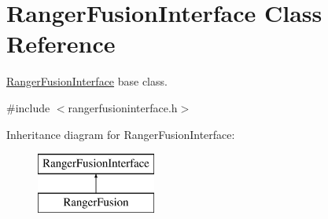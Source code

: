 \hypertarget{classRangerFusionInterface}{}\section{Ranger\+Fusion\+Interface Class Reference}
\label{classRangerFusionInterface}


\hyperlink{classRangerFusionInterface}{Ranger\+Fusion\+Interface} base class.  




{\ttfamily \#include $<$rangerfusioninterface.\+h$>$}

Inheritance diagram for Ranger\+Fusion\+Interface\+:\begin{figure}[H]
\begin{center}
\leavevmode
\includegraphics[height=2.000000cm]{classRangerFusionInterface}
\end{center}
\end{figure}

